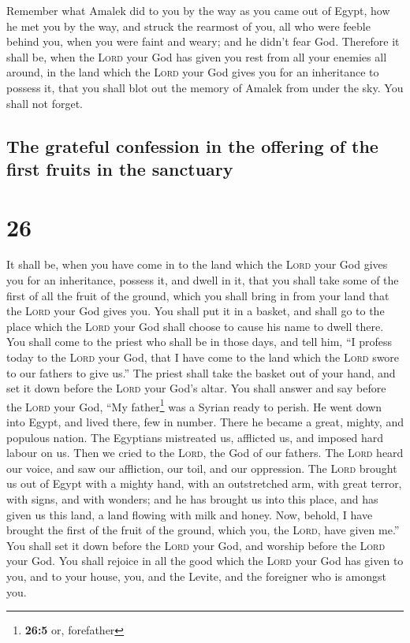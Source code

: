  Remember what Amalek did to you by the way as you came
out of Egypt,  how he met you by the way, and struck the
rearmost of you, all who were feeble behind you, when you were faint and
weary; and he didn't fear God.  Therefore it shall be,
when the \textsc{Lord} your God has given you rest from all your enemies
all around, in the land which the \textsc{Lord} your God gives you for
an inheritance to possess it, that you shall blot out the memory of
Amalek from under the sky. You shall not forget.

\hypertarget{the-grateful-confession-in-the-offering-of-the-first-fruits-in-the-sanctuary}{%
\subsection{The grateful confession in the offering of the first fruits
in the
sanctuary}\label{the-grateful-confession-in-the-offering-of-the-first-fruits-in-the-sanctuary}}

\hypertarget{section-25}{%
\section{26}\label{section-25}}

 It shall be, when you have come in to the land which the
\textsc{Lord} your God gives you for an inheritance, possess it, and
dwell in it,  that you shall take some of the first of all
the fruit of the ground, which you shall bring in from your land that
the \textsc{Lord} your God gives you. You shall put it in a basket, and
shall go to the place which the \textsc{Lord} your God shall choose to
cause his name to dwell there.  You shall come to the
priest who shall be in those days, and tell him, ``I profess today to
the \textsc{Lord} your God, that I have come to the land which the
\textsc{Lord} swore to our fathers to give us.''  The
priest shall take the basket out of your hand, and set it down before
the \textsc{Lord} your God's altar.  You shall answer and
say before the \textsc{Lord} your God, ``My father\footnote{\textbf{26:5}
  or, forefather} was a Syrian ready to perish. He went down into Egypt,
and lived there, few in number. There he became a great, mighty, and
populous nation.  The Egyptians mistreated us, afflicted
us, and imposed hard labour on us.  Then we cried to the
\textsc{Lord}, the God of our fathers. The \textsc{Lord} heard our
voice, and saw our affliction, our toil, and our oppression.
 The \textsc{Lord} brought us out of Egypt with a mighty
hand, with an outstretched arm, with great terror, with signs, and with
wonders;  and he has brought us into this place, and has
given us this land, a land flowing with milk and honey. 
Now, behold, I have brought the first of the fruit of the ground, which
you, the \textsc{Lord}, have given me.'' You shall set it down before
the \textsc{Lord} your God, and worship before the \textsc{Lord} your
God.  You shall rejoice in all the good which the
\textsc{Lord} your God has given to you, and to your house, you, and the
Levite, and the foreigner who is amongst you.

